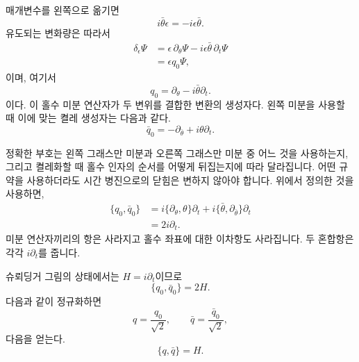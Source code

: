 매개변수를 왼쪽으로 옮기면
\begin{equation}
i\bar\theta\epsilon=-i\epsilon\bar\theta.
\end{equation}
유도되는 변화량은 따라서
\begin{align}
\delta_\epsilon\Psi
&=\epsilon\,\partial_\theta\Psi
-i\epsilon\bar\theta\,\partial_t\Psi\\
&=\epsilon q_0\Psi,
\end{align}
이며, 여기서
\begin{equation}
q_0=\partial_\theta-i\bar\theta\partial_t.
\end{equation}
이다. 이 홀수 미분 연산자가 두 변위를 결합한 변환의 생성자다. 왼쪽 미분을 사용할 때 이에 맞는 켤레 생성자는 다음과 같다.
\begin{equation}
\bar q_0=-\partial_{\bar\theta}
+i\theta\partial_t.
\end{equation}

정확한 부호는 왼쪽 그래스만 미분과 오른쪽 그래스만 미분 중 어느 것을 사용하는지, 그리고 켤레화할 때 홀수 인자의 순서를 어떻게 뒤집는지에 따라 달라집니다. 어떤 규약을 사용하더라도 시간 병진으로의 닫힘은 변하지 않아야 합니다. 위에서 정의한 것을 사용하면,
\begin{align}
\{q_0,\bar q_0\}
&=i\{\partial_\theta,\theta\}\partial_t
+i\{\bar\theta,\partial_{\bar\theta}\}\partial_t\\
&=2i\partial_t.
\end{align}
미분 연산자끼리의 항은 사라지고 홀수 좌표에 대한 이차항도 사라집니다. 두 혼합항은 각각 \(i\partial_t\)를 줍니다.

슈뢰딩거 그림의 상태에서는 \(H=i\partial_t\)이므로
\begin{equation}
\{q_0,\bar q_0\}=2H.
\end{equation}
다음과 같이 정규화하면
\begin{equation}
q=\frac{q_0}{\sqrt2},
\qquad
\bar q=\frac{\bar q_0}{\sqrt2},
\end{equation}
다음을 얻는다.
\begin{equation}
\boxed{\{q,\bar q\}=H.}
\end{equation}

\begin{classroomqa}
\end{classroomqa}

